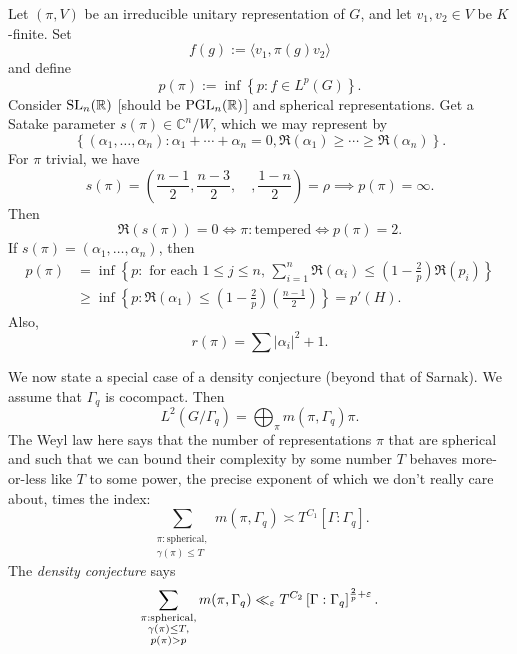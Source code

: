 \documentclass[reqno]{amsart} 
\begin{document}
Let $(\pi, V)$ be an irreducible unitary representation of $G$, and let $v_1, v_2 \in V$ be $K$-finite.  Set
\begin{equation*}
 f (g) := \langle v_1, \pi (g) v_2  \rangle
\end{equation*}
and define
\begin{equation*}
p (\pi) := \inf \left\{ p : f \in L^p (G)  \right\}.
\end{equation*}
Consider $\operatorname{SL}_n (\mathbb{R})$ [should be $\operatorname{PGL}_n(\mathbb{R})$] and spherical representations.  Get a Satake parameter $s (\pi) \in \mathbb{C}^n / W$, which we may represent by
\begin{equation*}
  \left\{ (\alpha_1, \dotsc, \alpha_n ) : \alpha_1 + \dotsb + \alpha_n = 0 ,
  \Re (\alpha_1 ) \geq \dotsb \geq \Re (\alpha_n )\right\}.
\end{equation*}
For $\pi$ trivial, we have
\begin{equation*}
s (\pi) = \left( \frac{n - 1 }{ 2} , \frac{n - 3}{2}, \quad, \frac{1 - n}{2} \right) = \rho \implies p (\pi) = \infty.
\end{equation*}
Then
\begin{equation*}
  \Re (s (\pi) )
  = 0 \iff \pi: \text{tempered} \iff p (\pi) = 2.
\end{equation*}
If $s (\pi) = (\alpha_1, \dotsc, \alpha_n )$, then
\begin{align*}
  p (\pi)
  &= \inf \left\{
    p : \text{ for each } 1 \leq j \leq n,
    \,
    \sum_{i = 1}^n \Re (\alpha_i ) \leq \left( 1 - \frac{2}{p} \right) \Re (p_i )
  \right\}
  \\
  &\geq \inf \left\{ p : \Re(\alpha_1) \leq \left( 1 - \frac{2}{p} \right)
    \left( \frac{n - 1}{2} \right)\right\}
    = p ' (H).
\end{align*}
Also,
\begin{equation*}
r (\pi) = \sum \left\lvert \alpha_i  \right\rvert^2 + 1.
\end{equation*}

We now state a special case of a density conjecture (beyond that of Sarnak).  We assume that $\Gamma_q $ is cocompact.  Then
\begin{equation*}
L^2 (G / \Gamma_q ) = \bigoplus_\pi m (\pi, \Gamma_q) \pi.
\end{equation*}
The Weyl law here says that the number of representations $\pi$ that are spherical and such that we can bound their complexity by some number $T$ behaves more-or-less like $T$ to some power, the precise exponent of which we don't really care about, times the index:
\begin{equation*}
  \sum_{
    \substack{
      \pi : \text{spherical},  \\
       \gamma (\pi) \leq T
    }
  }
  m (\pi, \Gamma_q )
  \asymp T^{C_1 } [\Gamma : \Gamma_q].
\end{equation*}
The \emph{density conjecture} says
\begin{equation*}
   \sum_{
    \substack{
      \pi : \text{spherical},  \\
      \gamma (\pi) \leq T, \\
      p (\pi) > p 
    }
  }
  m (\pi, \Gamma_q )
  \ll_\varepsilon T^{C_2} \left[ \Gamma : \Gamma_q \right]^{\frac{2}{p} + \varepsilon}.
\end{equation*}
\end{document}
